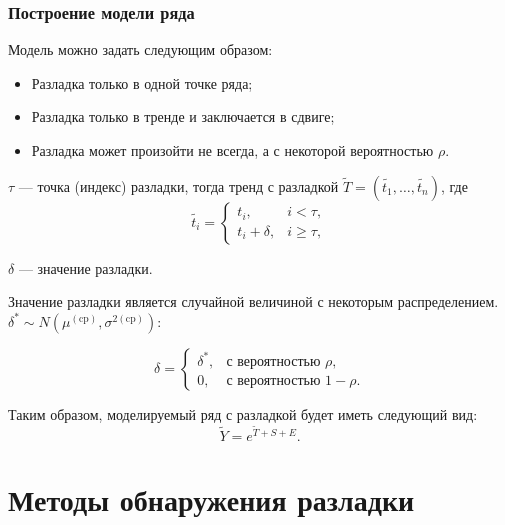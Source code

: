 \documentclass[intlimits, 9pt, unicode]{beamer}
\begin{document}
\begin{frame}
    \frametitle{Построение модели ряда}

Модель можно задать следующим образом:
\begin{itemize}
	\item Разладка только в одной точке ряда;
	\item Разладка только в тренде и заключается в сдвиге;
	\item Разладка может произойти не всегда, а с некоторой вероятностью $\rho$.
\end{itemize}
$\tau$ --- точка (индекс) разладки, тогда тренд с разладкой $ \tilde{T} = (\tilde{t_1}, \dots, \tilde{t_n}) $, где
\begin{equation*}
\tilde{t_i} =
	\begin{cases}
		t_i, & i < \tau, \\
		t_i + \delta, & i \geqslant \tau,
	\end{cases}
\end{equation*}

$ \delta $  --- значение разладки.

Значение разладки является случайной величиной с некоторым распределением. $ \delta^* \sim N(\mu^{\mathrm{(cp)}}, \sigma^{2\mathrm{(cp)}})  $:

\begin{equation*}
\delta = \begin{cases}
    		\delta^*, & \textrm{с вероятностью } \rho, \\
  		0, & \textrm{с вероятностью } 1 - \rho.
	\end{cases} 
\end{equation*}

Таким образом, моделируемый ряд с разладкой будет иметь следующий вид:
\begin{equation*}
\tilde{Y} = e^{\tilde{T} + S + E}. 
\end{equation*}


\end{frame}

\section{Методы обнаружения разладки}
\end{document}
